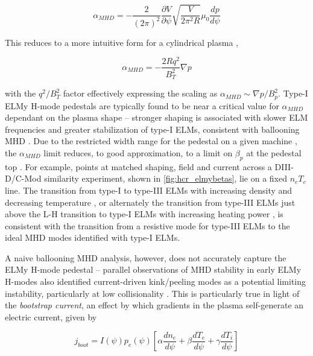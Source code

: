 \begin{equation}\label{eq:alphaMHD}
 \alpha_{MHD} = - \frac{2}{(2\pi)^2} \frac{\partial V}{\partial \psi} \sqrt{\frac{V}{2\pi^2 R}} \mu_0 \frac{dp}{d\psi}
\end{equation}

\noindent This reduces to a more intuitive form for a cylindrical plasma \cite{Connor1978},

\begin{equation}\label{eq:alphaMHD_cyl}
 \alpha_{MHD} = -\frac{2Rq^2}{B_T^2} \nabla p
\end{equation}

\noindent with the $q^2/B_T^2$ factor effectively expressing the scaling as $\alpha_{MHD} \sim \nabla p / B_p^2$.  Type-I ELMy H-mode pedestals are typically found to be near a critical value for $\alpha_{MHD}$ dependant on the plasma shape \cite{Osborne1998} -- stronger shaping is associated with slower ELM frequencies and greater stabilization of type-I ELMs, consistent with ballooning MHD \cite{Zohm1996,Saibene1999,Urano2003}.  Due to the restricted width range for the pedestal on a given machine \cite{Maggi2010,Schneider2013}, the $\alpha_{MHD}$ limit reduces, to good approximation, to a limit on $\beta_{p}$ at the pedestal top \cite{Saibene1999,Urano2003}.  For example, points at matched shaping, field and current across a DIII-D/C-Mod similarity experiment, shown in \cref{fig:hcr_elmybetas}, lie on a fixed $n_e T_e$ line.  The transition from type-I to type-III ELMs with increasing density and decreasing temperature \cite{Saibene1999}, or alternately the transition from type-III ELMs just above the L-H transition to type-I ELMs with increasing heating power \cite{Connor1998}, is consistent with the transition from a resistive mode for type-III ELMs to the ideal MHD modes identified with type-I ELMs.

A naive ballooning MHD analysis, however, does not accurately capture the ELMy H-mode pedestal -- parallel observations of MHD stability in early ELMy H-modes also identified current-driven kink/peeling modes as a potential limiting instability, particularly at low collisionality \cite{Connor1998,Suttrop2000,Groebner1998a}.  This is particularly true in light of the \emph{bootstrap current}, an effect by which gradients in the plasma self-generate an electric current, given by \cite{Sauter1999}

\begin{equation}\label{eq:jboot}
 j_{boot} = I(\psi) p_e(\psi) \left[ \alpha \frac{dn_e}{d\psi} + \beta \frac{dT_e}{d\psi} + \gamma \frac{dT_i}{d\psi}\right]
\end{equation}

